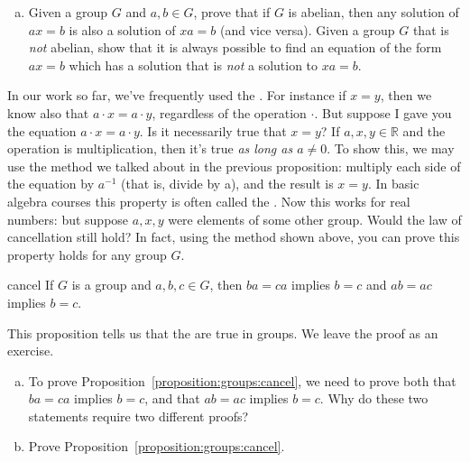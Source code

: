 \begin{exercise}{54}
\begin{enumerate}[(a)]
\item
Given a group $G$ and $a, b \in G$, prove that if $G$ is abelian, then any solution of $ax = b$ is also a solution of $xa = b$ (and vice versa).
Given a group $G$  that is \emph{not} abelian, show that it is always possible to find an equation of the form $ax = b$ which has a solution that is \emph{not} a solution to $xa = b$.
\end{enumerate}
\end{exercise}

In our work so far, we've frequently used the .  For instance if $x = y$, then we know also that $a\cdot x = a \cdot y$, regardless of the operation $\cdot$.   But suppose I gave you the equation $a \cdot x = a \cdot y$.  Is it necessarily true that $x = y$?  If $a, x,y \in {\mathbb R}$ and the operation is multiplication, then it's true \emph{as long as $a \neq 0$}.  To show this, we may use  the method we talked about in the previous proposition:  multiply each side of the equation by $a^{-1}$ (that is, divide by a), and the result is $x = y$.  In basic algebra courses this property is often called the .  
Now this works for real numbers: but suppose $a,x,y$ were elements of some other group.  Would the law of cancellation still hold?  In fact, using the method shown above, you can prove this property holds for any group $G$. 

\begin{prop}{cancel}
If $G$ is a group and $a, b, c \in G$, then $ba = ca$ implies $b = c$
and $ab = ac$ implies $b = c$. 
\end{prop} 
 
This proposition tells us that the  are true in groups.  We leave the proof as an exercise.

\begin{exercise}{56}
\begin{enumerate}[(a)]
\item
To prove  Proposition~\ref{proposition:groups:cancel}, we need to prove both that   $ba = ca$ implies $b = c$,  and that $ab = ac$ implies $b = c$. Why do these two statements require two different proofs?
\item
Prove Proposition~\ref{proposition:groups:cancel}.
\end{enumerate}
\end{exercise} 
 
